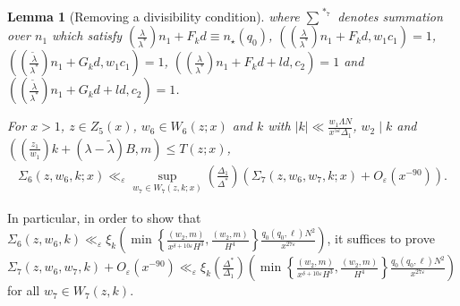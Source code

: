 \documentclass{amsart}
\newtheorem{lemma}{Lemma}
\numberwithin{equation}{section}
\begin{document}
\begin{lemma}[Removing a divisibility condition]
\vspace{-2mm}
 where $\sum\limits^{\,\,*_7}$ denotes summation over $n_1$ which satisfy  $(\frac{\lambda}{\lambda^*})n_1 + F_k d \equiv n_\star (q_0)$, $ ((\frac{\lambda}{\lambda^*})n_1 + F_k d,w_1 c_1)=1$,  $(( \frac{\widetilde{\lambda}}{\lambda^*}) n_1 + G_kd,w_1 c_1)=1$,  $((\frac{\lambda}{\lambda^*})n_1 + F_k d+ld, c_2)=1$ and $(( \frac{\widetilde{\lambda}}{\lambda^*}) n_1 + G_kd+l d, c_2)=1$.

\vspace{3mm}
For  $x>1$,  $z \in Z_5(x)$, $w_6 \in W_6(z;x)$ and $k $  
 with $|k| \ll  \frac{w_1\Lambda N}{x^{5\varepsilon}\Delta_1}$, $w_2 \mid k$ and  $((\frac{z_1}{w_1})k+(\lambda-\widetilde{\lambda})B,m) \leq T(z;x)$,
 \begin{align*}
 \Sigma_6(z,w_6,k;x) \ll_\varepsilon \sup_{w_7 \in W_7(z,k;x)} \left( \frac{\Delta_1}{\Delta^*}\right) (\Sigma_7(z,w_6,w_7,k;x) + O_\varepsilon(x^{-90})).
\end{align*}   
\end{lemma}
In particular, in order to show that $\Sigma_6(z,w_6,k) \ll_\varepsilon \xi_k  \left(\min\left\{\frac{(w_2,m)}{x^{\delta+10\varepsilon}H^3},\frac{(w_2,m)}{H^4}\right\}\frac{q_0(q_0,\ell)  N^2}{ x^{27\varepsilon}} \right)$, it suffices to prove  $\Sigma_7(z,w_6,w_7,k) + O_\varepsilon(x^{-90}) \ll_\varepsilon \xi_k  \left( \frac{\Delta^*}{\Delta_1}\right)\left(\min\left\{\frac{(w_2,m)}{x^{\delta+10\varepsilon}H^3},\frac{(w_2,m)}{H^4}\right\}\frac{q_0(q_0,\ell)  N^2}{ x^{27\varepsilon}} \right)$ for all $w_7 \in W_7(z,k)$.
\end{document}

